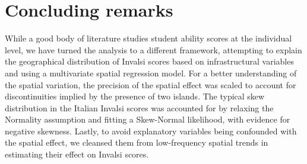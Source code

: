 \documentclass[openany, 11pt, oneside]{book}
\begin{document}
\begin{table}[ht]
  \captionsetup{width=0.9\textwidth}
\caption{Posterior summaries of hyperparameters when $z$ is defined as a province-level ICAR, under the base model and the Spatial+2.0 model (optimal combination of eigenvector removal under the WAIC metric)}
\label{tab:hyperpar_invalsi}
\end{table}

\section{Concluding remarks}

While a good body of literature studies student ability scores at the individual level, we have turned the analysis to a different framework, attempting to explain the geographical distribution of Invalsi scores based on infrastructural variables and using a multivariate spatial regression model. For a better understanding of the spatial variation, the precision of the spatial effect was scaled to account for discontinuities implied by the presence of two islands. The typical skew distribution in the Italian Invalsi scores was accounted for by relaxing the Normality assumption and fitting a Skew-Normal likelihood, with evidence for negative skewness. Lastly, to avoid explanatory variables being confounded with the spatial effect, we cleansed them from low-frequency spatial trends in estimating their effect on Invalsi scores.
\end{document}
